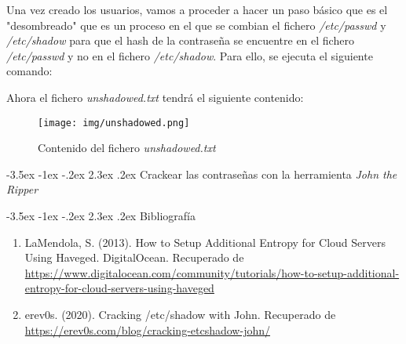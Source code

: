 \documentclass[11pt]{report}
\makeatletter
\renewcommand\chapter{\@startsection{chapter}{0}{\z@}%
    {-3.5ex \@plus -1ex \@minus -.2ex}%
    {2.3ex \@plus.2ex}%
    {\normalfont\Large\bfseries}}
\makeatother
\begin{document}
Una vez creado los usuarios, vamos a proceder a hacer un paso básico que es el "desombreado" que es 
un proceso en el que se combian el fichero \emph{/etc/passwd} y \emph{/etc/shadow} para que el hash de
la contraseña se encuentre en el fichero \emph{/etc/passwd} y no en el fichero \emph{/etc/shadow}. Para
ello, se ejecuta el siguiente comando:
\lstset{style=mystyle}


Ahora el fichero \emph{unshadowed.txt} tendrá el siguiente contenido:
\begin{figure}[H]
  \centering
  \texttt{[image: img/unshadowed.png]}
  \caption{Contenido del fichero \emph{unshadowed.txt}}
  \label{fig:contenido del fichero unshadow.txt}
\end{figure}

\cleardoublepage

\chapter{Crackear las contraseñas con la herramienta \emph{John the Ripper}}


\cleardoublepage

\chapter{Bibliografía} %
\begin{enumerate}
\item LaMendola, S. (2013). How to Setup Additional Entropy for Cloud Servers Using Haveged. DigitalOcean. Recuperado de \url{https://www.digitalocean.com/community/tutorials/how-to-setup-additional-entropy-for-cloud-servers-using-haveged}
\item erev0s. (2020). Cracking /etc/shadow with John. Recuperado de \url{https://erev0s.com/blog/cracking-etcshadow-john/}  
\end{enumerate}
\end{document}
